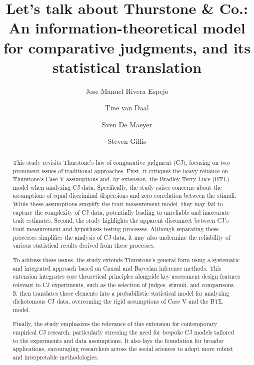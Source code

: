 \documentclass[
  authoryear,
  review,
  1p]{elsarticle}
\begin{document}
\begin{frontmatter}
\title{Let's talk about Thurstone \& Co.: An information-theoretical
model for comparative judgments, and its statistical translation}
\author[1]{Jose Manuel Rivera Espejo%
%
}
\author[1]{Tine van Daal%
%
}
\author[1]{Sven De Maeyer%
%
}
\author[2]{Steven Gillis%
%
}






        
\begin{abstract}
This study revisits Thurstone's law of comparative judgment (CJ),
focusing on two prominent issues of traditional approaches. First, it
critiques the heavy reliance on Thurstone's Case V assumptions and, by
extension, the Bradley-Terry-Luce (BTL) model when analyzing CJ data.
Specifically, the study raises concerns about the assumptions of equal
discriminal dispersions and zero correlation between the stimuli. While
these assumptions simplify the trait measurement model, they may fail to
capture the complexity of CJ data, potentially leading to unreliable and
inaccurate trait estimates. Second, the study highlights the apparent
disconnect between CJ's trait measurement and hypothesis testing
processes. Although separating these processes simplifies the analysis
of CJ data, it may also undermine the reliability of various statistical
results derived from these processes.

To address these issues, the study extends Thurstone's general form
using a systematic and integrated approach based on Causal and Bayesian
inference methods. This extension integrates core theoretical principles
alongside key assessment design features relevant to CJ experiments,
such as the selection of judges, stimuli, and comparisons. It then
translates these elements into a probabilistic statistical model for
analyzing dichotomous CJ data, overcoming the rigid assumptions of Case
V and the BTL model.

Finally, the study emphasizes the relevance of this extension for
contemporary empirical CJ research, particularly stressing the need for
bespoke CJ models tailored to the experiments and data assumptions. It
also lays the foundation for broader applications, encouraging
researchers across the social sciences to adopt more robust and
interpretable methodologies.
\end{abstract}






\end{frontmatter}
\end{document}
